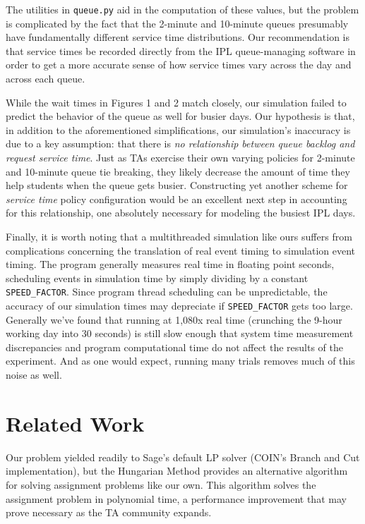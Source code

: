 \documentclass{article}
\begin{document}
\begin{multicols}{2}
The utilities in \texttt{queue.py} aid in the computation of these values, but the problem is complicated by the fact that the 2-minute and 10-minute queues presumably have fundamentally different service time distributions. Our recommendation is that service times be recorded directly from the IPL queue-managing software in order to get a more accurate sense of how service times vary across the day and across each queue.

While the wait times in Figures 1 and 2 match closely, our simulation failed to predict the behavior of the queue as well for busier days. Our hypothesis is that, in addition to the aforementioned simplifications, our simulation's inaccuracy is due to a key assumption: that there is \textit{no relationship between queue backlog and request service time}. Just as TAs exercise their own varying policies for 2-minute and 10-minute queue tie breaking, they likely decrease the amount of time they help students when the queue gets busier. Constructing yet another scheme for 
\textit{service time} policy configuration would be an excellent next step in accounting for this relationship, one absolutely necessary for modeling the busiest IPL days.

Finally, it is worth noting that a multithreaded simulation like ours suffers from complications concerning the translation of real event timing to simulation event timing. The program generally measures real time in floating point seconds, scheduling events in simulation time by simply dividing by a constant \texttt{SPEED\_FACTOR}. Since program thread scheduling can be unpredictable, the accuracy of our simulation times may depreciate if \texttt{SPEED\_FACTOR} gets too large. Generally we've found that running at 1,080x real time (crunching the 9-hour working day into 30 seconds) is still slow enough that system time measurement discrepancies and program computational time do not affect the results of the experiment. And as one would expect, running many trials removes much of this noise as well.

\section*{Related Work}

Our problem yielded readily to Sage's default LP solver (COIN's Branch and Cut implementation), but the Hungarian Method provides an alternative algorithm for solving assignment problems like our own. This algorithm solves the assignment problem in polynomial time, a performance improvement that may prove necessary as the TA community expands.


\end{multicols}
\end{document}
